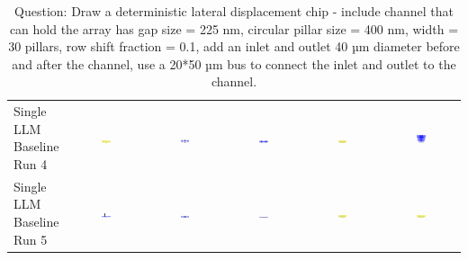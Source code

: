 \begin{table}
\begin{tabular}{@{}lccccc@{}}
    \makecell{Single LLM \\ Baseline \\ Run 4} & \includegraphics[width=0.13\textwidth]{./run_4/png/gpt-4o_results/DLDChip.png} & \includegraphics[width=0.13\textwidth]{./run_4/png/o1-preview_results/DLDChip.png} & \includegraphics[width=0.13\textwidth]{./run_4/png/claude-3-5-sonnet-20240620_results/DLDChip.png} & \includegraphics[width=0.13\textwidth]{./run_4/png/watsonx_meta-llama_llama-3-1-70b-instruct_results/DLDChip.png} & \includegraphics[width=0.13\textwidth]{./run_4/png/watsonx_meta-llama_llama-3-405b-instruct_results/DLDChip.png} \\
    \makecell{Single LLM \\ Baseline \\ Run 5} & \includegraphics[width=0.13\textwidth]{./run_5/png/gpt-4o_results/DLDChip.png} & \includegraphics[width=0.13\textwidth]{./run_5/png/o1-preview_results/DLDChip.png} & \includegraphics[width=0.13\textwidth]{./run_5/png/claude-3-5-sonnet-20240620_results/DLDChip.png} & \includegraphics[width=0.13\textwidth]{./run_5/png/watsonx_meta-llama_llama-3-1-70b-instruct_results/DLDChip.png} & \includegraphics[width=0.13\textwidth]{./run_5/png/watsonx_meta-llama_llama-3-405b-instruct_results/DLDChip.png} \\
    \bottomrule
  \end{tabular}
  \caption*{Question: Draw a deterministic lateral displacement chip - include channel that can hold the array has gap size = 225 nm, circular pillar size = 400 nm, width = 30 pillars, row shift fraction = 0.1, add an inlet and outlet 40 µm diameter before and after the channel, use a 20*50 µm bus to connect the inlet and outlet to the channel.}
\end{table}
